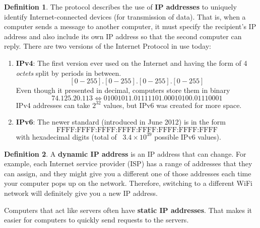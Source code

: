 \documentclass[a4paper, 12pt]{report}
\theoremstyle{remark}
\theoremstyle{definition}
\newtheorem{definition}{Definition}[section]
\begin{document}
\begin{definition}
The protocol describes the use of \textbf{IP addresses} to uniquely identify Internet-connected devices (for transmission of data). That is, when a computer sends a message to another computer, it must specify the recipient's IP address and also include its own IP address so that the second computer can reply. There are two versions of the Internet Protocol in use today: 
\begin{enumerate}
    \item \textbf{IPv4}: The first version ever used on the Internet and having the form of 4 \textit{octets} split by periods in between. 
    \[[0-255].[0-255].[0-255].[0-255]\]
    Even though it presented in decimal, computers store them in binary 
    \[74.125.20.113 \iff 01001011.01111101.00010100.01110001\]
    IPv4 addresses can take $2^{32}$ values, but IPv6 was created for more space.
    \item \textbf{IPv6}: The newer standard (introduced in June 2012) is in the form 
    \[\text{FFFF:FFFF:FFFF:FFFF:FFFF:FFFF:FFFF:FFFF}\]
    with hexadecimal digits (total of ~$3.4 \times 10^{39}$ possible IPv6 values). 
\end{enumerate}
\end{definition}

\begin{definition}
A \textbf{dynamic IP address} is an IP address that can change. For example, each Internet service provider (ISP) has a range of addresses that they can assign, and they might give you a different one of those addresses each time your computer pops up on the network. Therefore, switching to a different WiFi network will definitely give you a new IP address. 

Computers that act like servers often have \textbf{static IP addresses}. That makes it easier for computers to quickly send requests to the servers. 
\end{definition}
\end{document}
